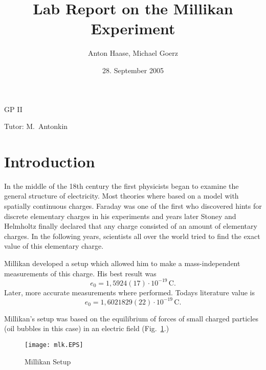 \documentclass[a4paper,10pt]{article}
\title{Lab Report on the Millikan Experiment}
\author{Anton Haase, Michael Goerz}
\date{28. September 2005}
\begin{document}
\maketitle
\noindent GP II

\noindent Tutor: M.~Antonkin

\section{Introduction}
In the middle of the 18th century the first physicists began to examine the general structure of electricity. Most theories where based on a model with spatially continuous charges. Faraday was one of the first who discovered hints for discrete elementary charges in his experiments and years later Stoney and Helmholtz finally declared that any charge consisted of an amount of elementary charges. In the following years, scientists all over the world tried to find the exact value of this elementary charge.

Millikan developed a setup which allowed him to make a mass-independent measurements of this charge.  His best result was
\begin{equation}
e_0 = 1,5924(17) \cdot 10^{-19} \, \text{C}.
\end{equation}
Later, more accurate measurements where performed. Todays literature value is
\begin{equation}
e_0 = 1,6021829(22) \cdot 10^{-19} \, \text{C}.
\end{equation}

Millikan's setup was based on the equilibrium of forces of small charged particles (oil bubbles in this case) in an electric field (Fig.~\ref{mlk}.)
\begin{figure}[htb]
    \centering
    \texttt{[image: mlk.EPS]}
    \caption{Millikan Setup}
    \label{mlk}
\end{figure}
\end{document}
